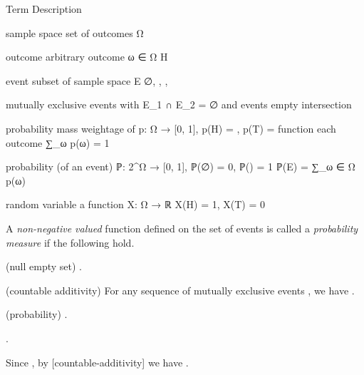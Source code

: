 \startchapter [title={Discrete Probability Spaces}]

	\setuptabulate [
		split=yes,
		header=text,
		frame=on,
		title={\tfa Notations}]

	\starttabulate [|l|l|M|m|]
		\FL  \FL
		\NC  Term  \NC  Description  \NC  {}  \NC  {}  \NR
		\ML  \ML

		\NC  sample space  \NC  set of outcomes  \NC  Ω  \NC  \bcrl[H, T]  \NR  \ML

		\NC  outcome  \NC  arbitrary outcome  \NC  ω ∈ Ω  \NC  H  \NR  \ML

		\NC  event  \NC  subset of sample space  \NC  E  \NC  ∅, \bcrl[H], \bcrl[T], \bcrl[H, T]  \NR  \ML

		\NC  mutually exclusive  \NC  events with  \NC  E_1 ∩ E_2 = ∅  \NC  \bcrl[H] and \bcrl[T]  \NR
		\NC  events  \NC  empty intersection  \NC  \NC  \NR  \ML

		\NC  probability mass  \NC  weightage of  \NC  p: Ω → [0, 1],   \NC  p(H) = , p(T) =   \NR
		\NC  function  \NC   each outcome  \NC  ∑_ω p(ω) = 1  \NC  \NR  \ML

		\NC  probability  \NC  (of an event)  \NC  ℙ: 2^Ω → [0, 1],  \NC  ℙ(∅) = 0, ℙ(\bcrl[H, T]) = 1  \NR
		\NC  \NC  \NC  ℙ(E) = ∑_{ω ∈ Ω} p(ω)  \NC  \NR  \ML

		\NC  random variable  \NC  a function  \NC  X: Ω → ℝ  \NC  X(H) = 1, X(T) = 0  \NR  \ML
		\BL
	\stoptabulate

\stopchapter


\startchapter [title={Axiomatic probability theory}]

	\startdefinition [title={Probability axioms}]
		A \emph{non-negative valued} function  defined on the set of events is called a \emph{probability measure} if the following hold.
			\item  (null empty set)  .
			\item[countable-additivity]  (countable additivity)  For any sequence of mutually exclusive events , we have .
			\item  (probability)  .
		\stopitemize
	\stopdefinition

	

	\startproposition
		.
	\stopproposition

	\startproof
		Since , by [countable-additivity] we have .
	\stopproof


